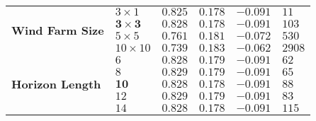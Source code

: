 \begin{tabular}{l|lllll}
\multirow{4}{*}{\textbf{Wind Farm Size}}       & $3 \times 1$           & $0.825$                         & $0.178$                         & $-0.091$                            & $11$ \\ 
&                                                        $\bm{3 \times 3}$    & $0.828$                         & $0.178$                         & $-0.091$                            & $103$ \\ 
&                                                        $5 \times 5$            & $0.761$                        & $0.181$                        & $-0.072$                           & $530$ \\ 
&                                                        $10 \times 10$          & $0.739$                       & $0.183$                       & $-0.062$                          & $2908$ \\ \hline 
\multirow{5}{*}{\textbf{Horizon Length}}       & $6$                     & $0.828$                       & $0.179$                       & $-0.091$                          & $62$ \\ 
&                                                        $8$                      & $0.829$                       & $0.179$                       & $-0.091$                          & $65$ \\ 
&                                                        $\bm{10}$             & $0.828$                      & $0.178$                      & $-0.091$                         & $88$ \\ 
&                                                        $12$                     & $0.829$                      & $0.179$                      & $-0.091$                         & $83$ \\ 
&                                                        $14$                     & $0.828$                      & $0.178$                      & $-0.091$                         & $115$ \\ \hline 
\end{tabular}